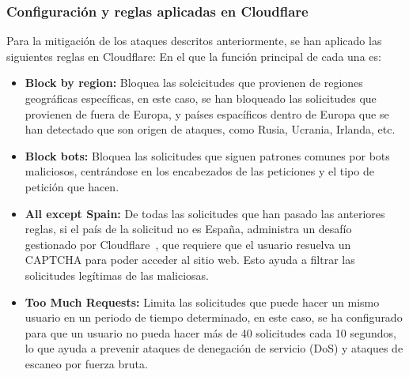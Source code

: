\subsubsection{Configuración y reglas aplicadas en Cloudflare}
Para la mitigación de los ataques descritos anteriormente, se han aplicado las siguientes reglas en Cloudflare:
En el que la función principal de cada una es:
\begin{itemize}
    \item \textbf{Block by region:} Bloquea las solcicitudes que provienen de regiones geográficas específicas, en este caso, se han bloqueado las solicitudes que provienen de fuera de Europa, y países espacíficos dentro de Europa que se han detectado que son origen de ataques, como Rusia, Ucrania, Irlanda, etc.
    \item \textbf{Block bots:} Bloquea las solicitudes que siguen patrones comunes por bots maliciosos, centrándose en los encabezados de las peticiones y el tipo de petición que hacen.
    \item \textbf{All except Spain:} De todas las solicitudes que han pasado las anteriores reglas, si el país de la solicitud no es España, administra un desafío gestionado por Cloudflare~\cite{CloudflareDocsTeam2025}, que requiere que el usuario resuelva un CAPTCHA para poder acceder al sitio web. Esto ayuda a filtrar las solicitudes legítimas de las maliciosas.
    \item \textbf{Too Much Requests:} Limita las solicitudes que puede hacer un mismo usuario en un periodo de tiempo determinado, en este caso, se ha configurado para que un usuario no pueda hacer más de 40 solicitudes cada 10 segundos, lo que ayuda a prevenir ataques de denegación de servicio (DoS) y ataques de escaneo por fuerza bruta.
\end{itemize}

